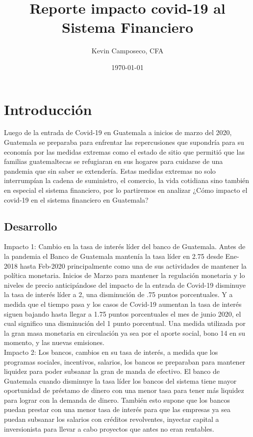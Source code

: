 \documentclass[12,a4paperpaper,]{article}
\title{Reporte impacto covid-19 al Sistema Financiero}
\author{Kevin Camposeco, CFA}
\date{\today}
\begin{document}
\renewcommand{\contentsname}{}

\renewcommand{\pagename}{Página}


\maketitle
\tableofcontents
{}
\clearpage

\section{Introducción}

Luego de la entrada de Covid-19 en Guatemala a inicios de marzo del
2020, Guatemala se preparaba para enfrentar las repercusiones que
supondría para su economía por las medidas extremas como el estado de
sitio que permitió que las familias guatemaltecas se refugiaran en sus
hogares para cuidarse de una pandemia que sin saber se extendería. Estas
medidas extremas no solo interrumpían la cadena de suministro, el
comercio, la vida cotidiana sino también en especial el sistema
financiero, por lo partiremos en analizar ¿Cómo impacto el covid-19 en
el sistema financiero en Guatemala?

\subsection{Desarrollo}

Impacto 1: Cambio en la tasa de interés líder del banco de Guatemala.
Antes de la pandemia el Banco de Guatemala mantenía la tasa líder en
2.75 desde Ene- 2018 hasta Feb-2020 principalmente como una de sus
actividades de mantener la política monetaria. Inicios de Marzo para
mantener la regulación monetaria y lo niveles de precio anticipándose
del impacto de la entrada de Covid-19 disminuye la tasa de interés líder
a 2, una disminución de .75 puntos porcentuales. Y a medida que el
tiempo pasa y los casos de Covid-19 aumentan la tasa de interés siguen
bajando hasta llegar a 1.75 puntos porcentuales el mes de junio 2020, el
cual significo una disminución del 1 punto porcentual. Una medida
utilizada por la gran masa monetaria en circulación ya sea por el aporte
social, bono 14 en su momento, y las nuevas emisiones.\\
Impacto 2: Los bancos, cambios en su tasa de interés, a medida que los
programas sociales, incentivos, salarios, los bancos se preparaban para
mantener liquidez para poder subsanar la gran de manda de efectivo. El
banco de Guatemala cuando disminuye la tasa líder los bancos del sistema
tiene mayor oportunidad de préstamo de dinero con una menor tasa para
tener más liquidez para lograr con la demanda de dinero. También esto
supone que los bancos puedan prestar con una menor tasa de interés para
que las empresas ya sea puedan subsanar los salarios con créditos
revolventes, inyectar capital a inversionista para llevar a cabo
proyectos que antes no eran rentables.
\end{document}
